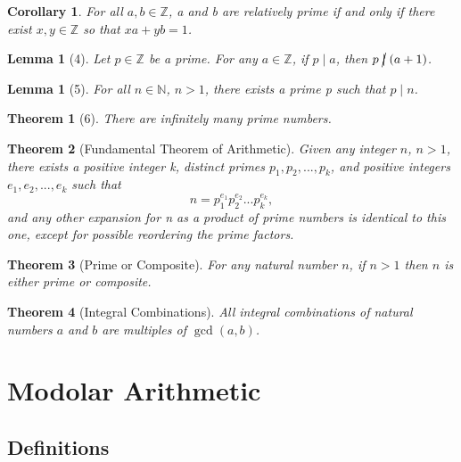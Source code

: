 \documentclass[12pt]{article}
\newtheorem*{thm*}{Theorem}
\newtheorem{lem}[thm]{Lemma}  %
\newtheorem{cor}[thm]{Corollary}
\theoremstyle{definition}
\theoremstyle{remark}
\numberwithin{equation}{section}
\newcommand\Z{\mathbb Z}    %
\newcommand\N{\mathbb N}    %
\begin{document}
\begin{cor}
        For all $a,b \in \Z$, a and b are relatively prime if and only if there exist $x,y \in \Z$ so that $xa + yb = 1$.
\end{cor}



\begin{lem}[4]
        Let $p \in \Z$ be a prime. For any $a \in \Z$, if $p\;\vert\;a$, then $p\;\cancel{\vert}\;(a+1)$.
\end{lem}


\begin{lem}[5]
        For all $n\in \N$, $n > 1$, there exists a prime p such that $p \;\vert\;n$.
\end{lem}

\begin{thm*}[6]
        There are infinitely many prime numbers.
\end{thm*}



\begin{thm*}[Fundamental Theorem of Arithmetic]
        Given any integer $n$, $n >1$, there exists a positive integer k, distinct primes $p_1,p_2,...,p_k$, and positive integers $e_1,e_2,...,e_k$ such that $$n = p_1^{e_1}p_2^{e_2}...p_k^{e_k},$$ and any other expansion for n as a product of prime numbers is identical to this one, except for possible reordering the prime factors.
\end{thm*}



\begin{thm*}[Prime or Composite]
        For any natural number $n$, if $n > 1$ then $n$ is either prime or composite.
\end{thm*}



\begin{thm*}[Integral Combinations]
        All integral combinations of natural numbers $a$ and $b$ are multiples of $\gcd(a,b)$.
\end{thm*}




\clearpage

\section{Modolar Arithmetic}


\subsection{Definitions}
\end{document}

